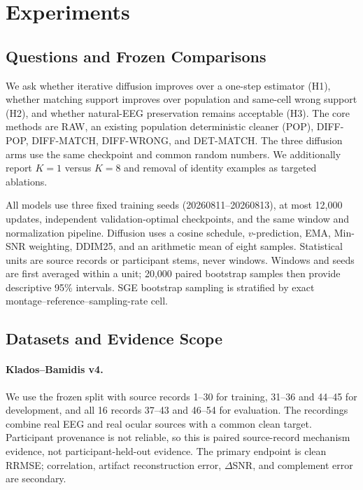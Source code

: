 \section{Experiments}
\label{sec:experiments}

\subsection{Questions and Frozen Comparisons}
We ask whether iterative diffusion improves over a one-step estimator (H1),
whether matching support improves over population and same-cell wrong support
(H2), and whether natural-EEG preservation remains acceptable (H3).  The core
methods are RAW, an existing population deterministic cleaner (POP), DIFF-POP,
DIFF-MATCH, DIFF-WRONG, and DET-MATCH.  The three diffusion arms use the same
checkpoint and common random numbers.  We additionally report $K=1$ versus
$K=8$ and removal of identity examples as targeted ablations.

All models use three fixed training seeds (20260811--20260813), at most 12,000
updates, independent validation-optimal checkpoints, and the same window and
normalization pipeline.  Diffusion uses a cosine schedule, $v$-prediction, EMA,
Min-SNR weighting, DDIM25, and an arithmetic mean of eight samples.  Statistical
units are source records or participant stems, never windows.  Windows and seeds
are first averaged within a unit; 20,000 paired bootstrap samples then provide
descriptive 95\% intervals.  SGE bootstrap sampling is stratified by exact
montage--reference--sampling-rate cell.

\subsection{Datasets and Evidence Scope}
\paragraph{Klados--Bamidis v4.}
We use the frozen split with source records 1--30 for training, 31--36 and
44--45 for development, and all 16 records 37--43 and 46--54 for evaluation.
The recordings combine real EEG and real ocular sources with a common clean
target.  Participant provenance is not reliable, so this is paired
source-record mechanism evidence, not participant-held-out evidence.  The
primary endpoint is clean RRMSE; correlation, artifact reconstruction error,
$\Delta$SNR, and complement error are secondary.

